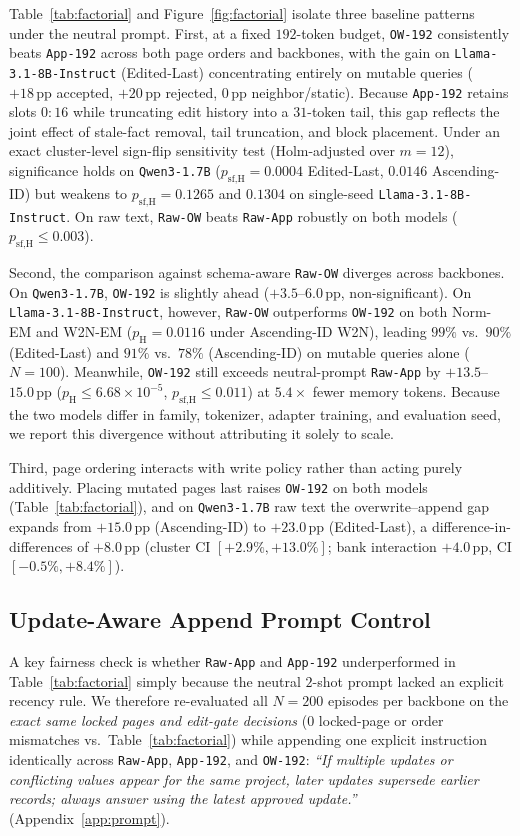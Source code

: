 \documentclass[10pt]{article}
\newcommand{\pp}{\,\text{pp}}
\renewcommand{\_}{\origunderscore\allowbreak}
\begin{document}
Table~\ref{tab:factorial} and Figure~\ref{fig:factorial} isolate three baseline patterns under the neutral prompt. First, at a fixed $192$-token budget, \texttt{OW-192} consistently beats \texttt{App-192} across both page orders and backbones, with the gain on \texttt{Llama-3.1-8B-Instruct} (Edited-Last) concentrating entirely on mutable queries ($+18\pp$ accepted, $+20\pp$ rejected, $0\pp$ neighbor/static). Because \texttt{App-192} retains slots $0{:}16$ while truncating edit history into a $31$-token tail, this gap reflects the joint effect of stale-fact removal, tail truncation, and block placement. Under an exact cluster-level sign-flip sensitivity test (Holm-adjusted over $m=12$), significance holds on \texttt{Qwen3-1.7B} ($p_{\text{sf,H}} = 0.0004$ Edited-Last, $0.0146$ Ascending-ID) but weakens to $p_{\text{sf,H}} = 0.1265$ and $0.1304$ on single-seed \texttt{Llama-3.1-8B-Instruct}. On raw text, \texttt{Raw-OW} beats \texttt{Raw-App} robustly on both models ($p_{\text{sf,H}} \le 0.003$).

Second, the comparison against schema-aware \texttt{Raw-OW} diverges across backbones. On \texttt{Qwen3-1.7B}, \texttt{OW-192} is slightly ahead ($+3.5$--$6.0\pp$, non-significant). On \texttt{Llama-3.1-8B-Instruct}, however, \texttt{Raw-OW} outperforms \texttt{OW-192} on both Norm-EM and W2N-EM ($p_{\text{H}} = 0.0116$ under Ascending-ID W2N), leading $99\%$ vs.\ $90\%$ (Edited-Last) and $91\%$ vs.\ $78\%$ (Ascending-ID) on mutable queries alone ($N=100$). Meanwhile, \texttt{OW-192} still exceeds neutral-prompt \texttt{Raw-App} by $+13.5$--$15.0\pp$ ($p_{\text{H}} \le 6.68\times 10^{-5}$, $p_{\text{sf,H}} \le 0.011$) at $5.4\times$ fewer memory tokens. Because the two models differ in family, tokenizer, adapter training, and evaluation seed, we report this divergence without attributing it solely to scale.

Third, page ordering interacts with write policy rather than acting purely additively. Placing mutated pages last raises \texttt{OW-192} on both models (Table~\ref{tab:factorial}), and on \texttt{Qwen3-1.7B} raw text the overwrite--append gap expands from $+15.0\pp$ (Ascending-ID) to $+23.0\pp$ (Edited-Last), a difference-in-differences of $+8.0\pp$ (cluster CI $[+2.9\%, +13.0\%]$; bank interaction $+4.0\pp$, CI $[-0.5\%, +8.4\%]$).

\subsection{Update-Aware Append Prompt Control}
\label{sec:gate2_ua}
A key fairness check is whether \texttt{Raw-App} and \texttt{App-192} underperformed in Table~\ref{tab:factorial} simply because the neutral $2$-shot prompt lacked an explicit recency rule. We therefore re-evaluated all $N=200$ episodes per backbone on the \emph{exact same locked pages and edit-gate decisions} ($0$ locked-page or order mismatches vs.\ Table~\ref{tab:factorial}) while appending one explicit instruction identically across \texttt{Raw-App}, \texttt{App-192}, and \texttt{OW-192}: \emph{``If multiple updates or conflicting values appear for the same project, later updates supersede earlier records; always answer using the latest approved update.''} (Appendix~\ref{app:prompt}).
\end{document}
